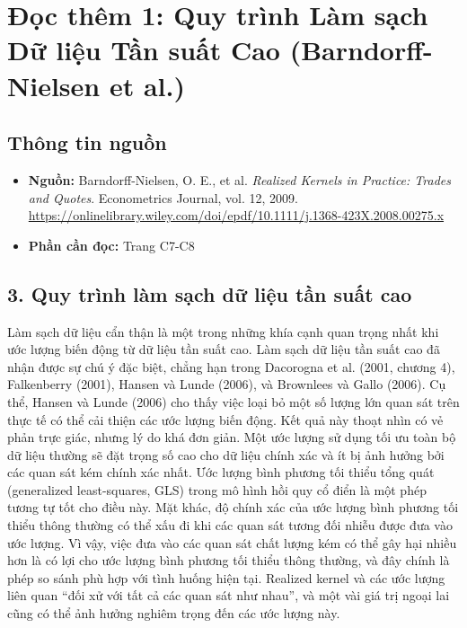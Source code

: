 \chapter{Đọc thêm 1: Quy trình Làm sạch Dữ liệu Tần suất Cao (Barndorff-Nielsen et al.)}
\label{ch:M3L3DT1}


\section{Thông tin nguồn}

\begin{itemize}
  \item \textbf{Nguồn:} Barndorff-Nielsen, O. E., et al. \emph{Realized Kernels in Practice: Trades and Quotes}. Econometrics Journal, vol. 12, 2009. \url{https://onlinelibrary.wiley.com/doi/epdf/10.1111/j.1368-423X.2008.00275.x}
  \item \textbf{Phần cần đọc:} Trang C7-C8
\end{itemize}

\section{3. Quy trình làm sạch dữ liệu tần suất cao}

Làm sạch dữ liệu cẩn thận là một trong những khía cạnh quan trọng nhất khi ước lượng biến động từ dữ liệu tần suất cao. Làm sạch dữ liệu tần suất cao đã nhận được sự chú ý đặc biệt, chẳng hạn trong Dacorogna et al. (2001, chương 4), Falkenberry (2001), Hansen và Lunde (2006), và Brownlees và Gallo (2006). Cụ thể, Hansen và Lunde (2006) cho thấy việc loại bỏ một số lượng lớn quan sát trên thực tế có thể cải thiện các ước lượng biến động. Kết quả này thoạt nhìn có vẻ phản trực giác, nhưng lý do khá đơn giản. Một ước lượng sử dụng tối ưu toàn bộ dữ liệu thường sẽ đặt trọng số cao cho dữ liệu chính xác và ít bị ảnh hưởng bởi các quan sát kém chính xác nhất. Ước lượng bình phương tối thiểu tổng quát (generalized least-squares, GLS) trong mô hình hồi quy cổ điển là một phép tương tự tốt cho điều này. Mặt khác, độ chính xác của ước lượng bình phương tối thiểu thông thường có thể xấu đi khi các quan sát tương đối nhiễu được đưa vào ước lượng. Vì vậy, việc đưa vào các quan sát chất lượng kém có thể gây hại nhiều hơn là có lợi cho ước lượng bình phương tối thiểu thông thường, và đây chính là phép so sánh phù hợp với tình huống hiện tại. Realized kernel và các ước lượng liên quan ``đối xử với tất cả các quan sát như nhau'', và một vài giá trị ngoại lai cũng có thể ảnh hưởng nghiêm trọng đến các ước lượng này.

